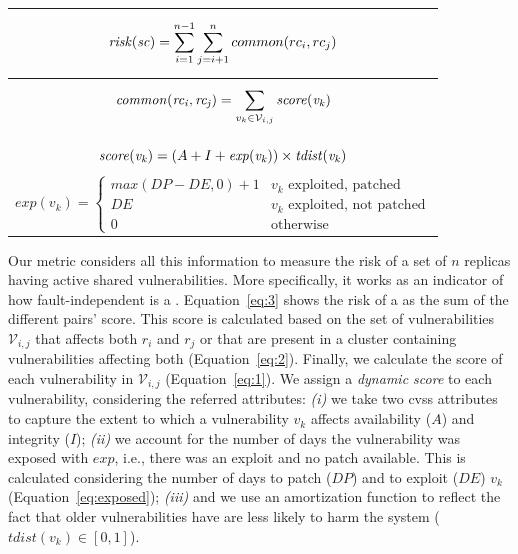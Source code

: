 \begin{table}[h]
\begin{center}
{\small
\begin{tabular}{ c }\hline
\vbox{
\begin{equation}
\mathit{risk(sc)}=\sum_{i=1}^{n-1} \sum_{j=i+1}^{n} common(rc_i,rc_j) \label{eq:3}
\end{equation}
}\\ \hline
\vbox{
\begin{equation}
\mathit{common(rc_i,rc_j)}=\sum_{v_k \in \mathcal{V}_{i,j}} \mathit{score(v_k)} \label{eq:2}
\end{equation}
}\\ \hline
\vbox{
\begin{equation}
\mathit{score(v_k)}= (A+I+\mathit{exp(v_k)}) \times \mathit{tdist(v_k)} \label{eq:1}
\end{equation}
\begin{equation}

\mathit{exp(v_k)}= \begin{cases}
		\mathit{max(\mathit{DP}-\mathit{DE},0)}+1 	& \text{$v_k$ exploited, patched}\\
  		\mathit{DE} 		& \text{$v_k$ exploited, not patched}\\
		0 		& \text{otherwise}
\end{cases} \label{eq:exposed}
\end{equation}
}\\ \hline

\end{tabular}
}
\label{tab:equations}
\end{center}
\end{table}

Our metric considers all this information to measure the risk of a set of $n$ replicas having active shared vulnerabilities.
More specifically, it works as an indicator of how fault-independent is a \configuration.
Equation~\ref{eq:3} shows the risk of a \configuration as the sum of the different \replica pairs' score.
This score is calculated based on the set of vulnerabilities $\mathcal{V}_{i,j}$ that affects both $r_i$ and $r_j$ or that are present in a cluster containing vulnerabilities affecting both \replicas (Equation~\ref{eq:2}).
Finally, we calculate the score of each vulnerability in $\mathcal{V}_{i,j}$ (Equation~\ref{eq:1}). 
We assign a \emph{dynamic score} to each vulnerability, considering the referred attributes:
\emph{(i)} we take two \gls{cvss} attributes to capture the extent to which a vulnerability $v_k$ affects availability ($A$) and integrity ($I$);
\emph{(ii)} we account for the number of days the vulnerability was exposed with $\mathit{exp}$, i.e., there was an exploit and no patch available.
This is calculated considering the number of days to patch ($DP$) and to exploit ($DE$) $v_k$ (Equation~\ref{eq:exposed}); 
\emph{(iii)} and we use an amortization function to reflect the fact that older vulnerabilities have are less likely to harm the system ($\mathit{tdist(v_k)} \in [0,1]$).


